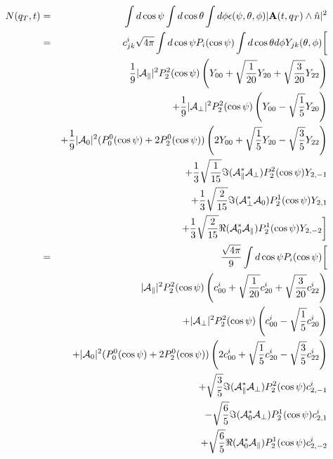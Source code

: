 \documentclass[a4paper,9pt,twoside]{article}
\begin{document}
\begin{eqnarray}
    N(q_T,t)  &=&  \int d\cos\psi\int d\cos\theta \int d\phi \epsilon(\psi,\theta,\phi) |{\bf A}(t,q_T) \wedge \hat{n}|^2 \\
      &=& c^i_{jk}\sqrt{4\pi} \int d\cos\psi   P_i(\cos\psi)  \int d\cos\theta d\phi Y_{jk}(\theta,\phi) 
          \biggl[  \\
          &&                   \frac{1}{9}|{\cal A}_\parallel|^2 P_2^2(\cos\psi) \left( Y_{00}+\sqrt{\frac{1}{20}}Y_{20}+\sqrt{\frac{3}{20}}Y_{22}  \right)  \\
          &&                  +\frac{1}{9}|{\cal A}_\perp|^2  P_2^2(\cos\psi) \left( Y_{00} - \sqrt{\frac{1}{5}}Y_{20}\right)\\
          &&                  +\frac{1}{9}|{\cal A}_0|^2  (P_0^0(\cos\psi)+2P_2^0(\cos\psi) ) \left( 2Y_{00}+\sqrt{\frac{1}{5}}Y_{20}-\sqrt{\frac{3}{5}}Y_{22} \right) \\
          &&                  +\frac{1}{3}\sqrt{\frac{1}{15}}\Im({\cal A}_\parallel^*{\cal A}_\perp)P_2^2(\cos\psi) Y_{2,-1}  \\
          &&                  +\frac{1}{3}\sqrt{ \frac{2}{15}} \Im({\cal A}_\perp^* {\cal A}_0 )P_2^1(\cos\psi)Y_{2,1} \\
          &&                  +\frac{1}{3}\sqrt{ \frac{2}{15}}\Re({\cal A}_0^*{\cal A}_\parallel  )P_2^1(\cos\psi) Y_{2,-2} 
          \biggr] \\
      &=& \frac{\sqrt{4\pi}}{9}  \int d\cos\psi   P_i(\cos\psi) \biggl[  \\
          &&                   |{\cal A}_\parallel|^2 P_2^2(\cos\psi)              \left( c^i_{00}  +\sqrt{\frac{1}{20}}c^i_{20}+\sqrt{\frac{3}{20}}c^i_{22}  \right)  \\
          &&                  +|{\cal A}_\perp|^2  P_2^2(\cos\psi)                 \left( c^i_{00}  -\sqrt{\frac{1}{ 5}}c^i_{20}\right)\\
          &&                  +|{\cal A}_0|^2  (P_0^0(\cos\psi)+2P_2^0(\cos\psi) ) \left( 2 c^i_{00}+\sqrt{\frac{1}{ 5}}c^i_{20}-\sqrt{\frac{3}{ 5}}c^i_{22} \right) \\
          &&                  +\sqrt{\frac{3}{5}}\Im({\cal A}_\parallel^*{\cal A}_\perp)P_2^2(\cos\psi) c^i_{2,-1}  \\
          &&                  -\sqrt{\frac{6}{5}} \Im({\cal A}_0^* {\cal A}_\perp )P_2^1(\cos\psi)c^i_{2,1} \\
          &&                  +\sqrt{\frac{6}{5}}\Re({\cal A}_0^*{\cal A}_\parallel  )P_2^1(\cos\psi) c^i_{2,-2} 

\end{eqnarray}
\end{document}
